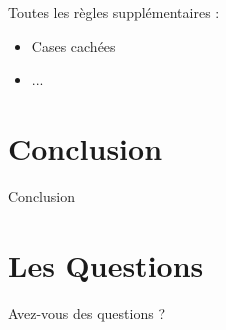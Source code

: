 \documentclass{beamer}
\begin{document}
\begin{darkframes}
\begin{frame}
Toutes les règles supplémentaires :
\begin{itemize}
\item Cases cachées
\item ...
\end{itemize}
		
    \end{frame}    
    
    
         \section{Conclusion}
 \begin{frame}
   	 \begin{center}
  \Huge	 Conclusion
  		\end{center}
    \end{frame}
    
     \section{Les Questions}
 \begin{frame}
   	 \begin{center}
  	 \Huge	 Avez-vous des questions ?
  		\end{center}
    \end{frame}
    
  \end{darkframes}
\end{document}
